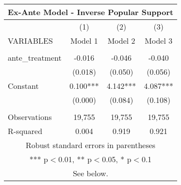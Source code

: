 \begin{tabular}{lccc}
\multicolumn{4}{c}{Ex-Ante Model - Inverse Popular Support} \\ \hline
 & (1) & (2) & (3) \\
VARIABLES & Model 1 & Model 2 & Model 3 \\ \hline
 &  &  &  \\
ante\_treatment & -0.016 & -0.046 & -0.040 \\
 & (0.018) & (0.050) & (0.056) \\
Constant & 0.100*** & 4.142*** & 4.087*** \\
 & (0.000) & (0.084) & (0.108) \\
 &  &  &  \\
Observations & 19,755 & 19,755 & 19,755 \\
 R-squared & 0.004 & 0.919 & 0.921 \\ \hline
\multicolumn{4}{c}{ Robust standard errors in parentheses} \\
\multicolumn{4}{c}{ *** p$<$0.01, ** p$<$0.05, * p$<$0.1} \\
\multicolumn{4}{c}{ See below.} \\
\end{tabular}
